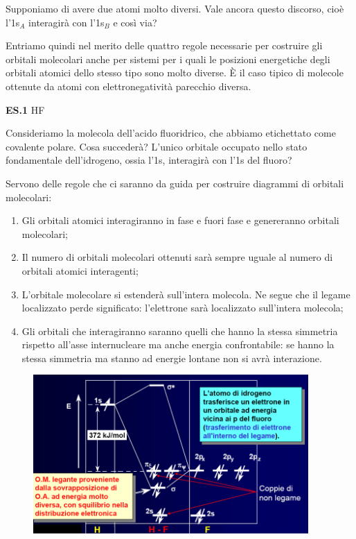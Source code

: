 Supponiamo di avere due atomi molto diversi. Vale ancora questo discorso, cioè l'1s$_A$ interagirà con l'1s$_B$ e così via?

Entriamo quindi nel merito delle quattro regole necessarie per costruire gli orbitali molecolari anche per sistemi per i quali le posizioni energetiche degli orbitali atomici dello stesso tipo sono molto diverse. È il caso tipico di molecole ottenute da atomi con elettronegatività parecchio diversa.

\vspace{0.2cm}\textbf{ES.1} HF

Consideriamo la molecola dell'acido fluoridrico, che abbiamo etichettato come covalente polare. Cosa succederà? L'unico orbitale occupato nello stato fondamentale dell'idrogeno, ossia l'1s, interagirà con l'1s del fluoro?

Servono delle regole che ci saranno da guida per costruire diagrammi di orbitali molecolari:

\begin{enumerate}
    \item Gli orbitali atomici interagiranno in fase e fuori fase e genereranno orbitali molecolari;
    \item Il numero di orbitali molecolari ottenuti sarà sempre uguale al numero di orbitali atomici interagenti;
    \item L'orbitale molecolare si estenderà sull'intera molecola. Ne segue che il legame localizzato perde significato: l'elettrone sarà localizzato sull'intera molecola;
    \item Gli orbitali che interagiranno saranno quelli che hanno la stessa simmetria rispetto all'asse internucleare ma anche energia confrontabile: se hanno la stessa simmetria ma stanno ad energie lontane non si avrà interazione.
\end{enumerate}

\vspace{-0.3cm}\begin{figure}[H]
    \centering
    \includegraphics[width=10.5cm]{immagini/orbitali_molecolari_HF.png}
\end{figure}

